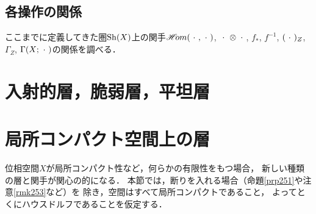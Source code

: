 \subsection*{各操作の関係}

ここまでに定義してきた圏\(\mathrm{Sh}(X)\)上の関手\(\mathop{\mathscr{H}\hspace{-2pt}om}\nolimits(\mathord{\ \cdot\ },\mathord{\ \cdot\ })\), 
\(\blk\tens\blk\), \(f_\ast\), \(f^{-1}\), \((\mathord{\ \cdot\ })_Z\), 
\(\Gamma_Z\), \(\Gamma(X;\mathord{\ \cdot\ })\)の関係を調べる．

\section{入射的層，脆弱層，平坦層}
\section{局所コンパクト空間上の層}
位相空間\(X\)が局所コンパクト性など，何らかの有限性をもつ場合，
新しい種類の層と関手が関心の的になる．
本節では，断りを入れる場合（命題\ref{prp251}や注意\ref{rmk253}など）を
除き，空間はすべて局所コンパクトであること，
よってとくにハウスドルフであることを仮定する．

